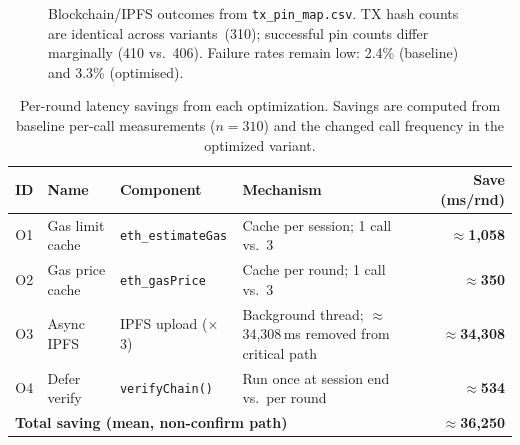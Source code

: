 \documentclass{llncs}
\begin{document}
\begin{figure}[htbp]
\caption{Blockchain/IPFS outcomes from \texttt{tx\_pin\_map.csv}. TX hash counts are identical across variants~(310); successful pin counts differ marginally (410 vs.\ 406). Failure rates remain low: 2.4\% (baseline) and 3.3\% (optimised).}
\label{fig:txpin_raw}
\end{figure}



\begin{table}[t]
\caption{Per-round latency savings from each optimization.
  Savings are computed from baseline per-call measurements
  ($n=310$) and the changed call frequency in the optimized variant.}
\label{tab:opts}
\centering\footnotesize
\setlength{\tabcolsep}{4pt}
\begin{tabular}{cllp{3.4cm}r}
\toprule
\textbf{ID} & \textbf{Name} & \textbf{Component} & \textbf{Mechanism}
  & \textbf{Save (ms/rnd)} \\
\midrule
O1 & Gas limit cache  & \texttt{eth\_estimateGas}
   & Cache per session; 1 call vs.\ 3
   & $\approx$\textbf{1{,}058} \\
O2 & Gas price cache  & \texttt{eth\_gasPrice}
   & Cache per round; 1 call vs.\ 3
   & $\approx$\textbf{350} \\
O3 & Async IPFS       & IPFS upload ($\times$3)
   & Background thread; $\approx$34{,}308\,ms removed from critical path
   & $\approx$\textbf{34{,}308} \\
O4 & Defer verify     & \texttt{verifyChain()}
   & Run once at session end vs.\ per round
   & $\approx$\textbf{534} \\
\midrule
\multicolumn{4}{l}{\textbf{Total saving (mean, non-confirm path)}}
  & $\approx$\textbf{36{,}250} \\
\bottomrule
\end{tabular}
\end{table}
\end{document}
